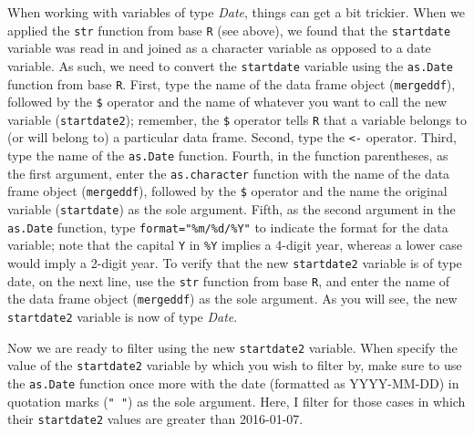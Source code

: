 \documentclass[]{book}
\newenvironment{Shaded}{\begin{snugshade}}{\end{snugshade}}
\newcommand{\KeywordTok}[1]{\textcolor[rgb]{0.13,0.29,0.53}{\textbf{#1}}}
\newcommand{\DataTypeTok}[1]{\textcolor[rgb]{0.13,0.29,0.53}{#1}}
\newcommand{\StringTok}[1]{\textcolor[rgb]{0.31,0.60,0.02}{#1}}
\newcommand{\CommentTok}[1]{\textcolor[rgb]{0.56,0.35,0.01}{\textit{#1}}}
\newcommand{\OperatorTok}[1]{\textcolor[rgb]{0.81,0.36,0.00}{\textbf{#1}}}
\newcommand{\NormalTok}[1]{#1}
\begin{document}
When working with variables of type \emph{Date}, things can get a bit
trickier. When we applied the \texttt{str} function from base \texttt{R}
(see above), we found that the \texttt{startdate} variable was read in
and joined as a character variable as opposed to a date variable. As
such, we need to convert the \texttt{startdate} variable using the
\texttt{as.Date} function from base \texttt{R}. First, type the name of
the data frame object (\texttt{mergeddf}), followed by the \texttt{\$}
operator and the name of whatever you want to call the new variable
(\texttt{startdate2}); remember, the \texttt{\$} operator tells
\texttt{R} that a variable belongs to (or will belong to) a particular
data frame. Second, type the \texttt{\textless{}-} operator. Third, type
the name of the \texttt{as.Date} function. Fourth, in the function
parentheses, as the first argument, enter the \texttt{as.character}
function with the name of the data frame object (\texttt{mergeddf}),
followed by the \texttt{\$} operator and the name the original variable
(\texttt{startdate}) as the sole argument. Fifth, as the second argument
in the \texttt{as.Date} function, type \texttt{format="\%m/\%d/\%Y"} to
indicate the format for the data variable; note that the capital
\texttt{Y} in \texttt{\%Y} implies a 4-digit year, whereas a lower case
would imply a 2-digit year. To verify that the new \texttt{startdate2}
variable is of type date, on the next line, use the \texttt{str}
function from base \texttt{R}, and enter the name of the data frame
object (\texttt{mergeddf}) as the sole argument. As you will see, the
new \texttt{startdate2} variable is now of type \emph{Date}.

\begin{Shaded}
\end{Shaded}

Now we are ready to filter using the new \texttt{startdate2} variable.
When specify the value of the \texttt{startdate2} variable by which you
wish to filter by, make sure to use the \texttt{as.Date} function once
more with the date (formatted as YYYY-MM-DD) in quotation marks
(\texttt{"\ "}) as the sole argument. Here, I filter for those cases in
which their \texttt{startdate2} values are greater than 2016-01-07.
\end{document}
